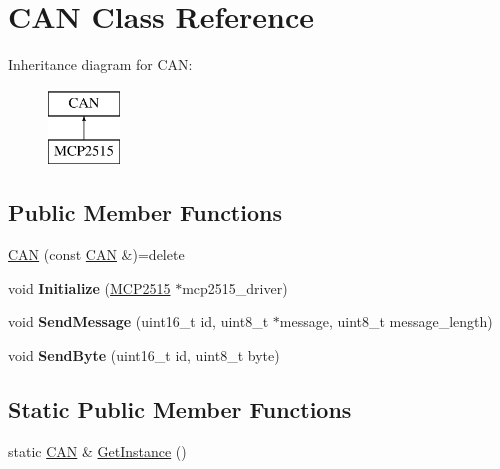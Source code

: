 \hypertarget{class_c_a_n}{}\section{C\+AN Class Reference}
\label{class_c_a_n}
Inheritance diagram for C\+AN\+:\begin{figure}[H]
\begin{center}
\leavevmode
\includegraphics[height=2.000000cm]{class_c_a_n}
\end{center}
\end{figure}
\subsection*{Public Member Functions}
\begin{DoxyCompactItemize}
\item 
\hyperlink{class_c_a_n_aa6e0f61963909bcd5634982c13b22616}{C\+AN} (const \hyperlink{class_c_a_n}{C\+AN} \&)=delete
\item 
void {\bfseries Initialize} (\hyperlink{class_m_c_p2515}{M\+C\+P2515} $\ast$mcp2515\+\_\+driver)\hypertarget{class_c_a_n_ab3ae9848787c8e22c38d576ff110782c}{}\label{class_c_a_n_ab3ae9848787c8e22c38d576ff110782c}

\item 
void {\bfseries Send\+Message} (uint16\+\_\+t id, uint8\+\_\+t $\ast$message, uint8\+\_\+t message\+\_\+length)\hypertarget{class_c_a_n_a70606c6cd99462eb6f8272cce52fc1ab}{}\label{class_c_a_n_a70606c6cd99462eb6f8272cce52fc1ab}

\item 
void {\bfseries Send\+Byte} (uint16\+\_\+t id, uint8\+\_\+t byte)\hypertarget{class_c_a_n_a0fffe8876d333d8bd6849d030bfe0449}{}\label{class_c_a_n_a0fffe8876d333d8bd6849d030bfe0449}

\end{DoxyCompactItemize}
\subsection*{Static Public Member Functions}
\begin{DoxyCompactItemize}
\item 
static \hyperlink{class_c_a_n}{C\+AN} \& \hyperlink{class_c_a_n_a19fc4b805fcebf3c465c3b3d8b7dc4f3}{Get\+Instance} ()
\end{DoxyCompactItemize}
